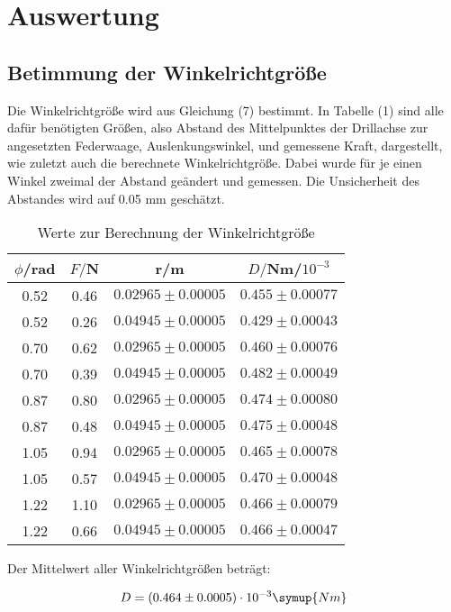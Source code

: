 \section{Auswertung}
\label{sec:Auswertung}

\subsection{Betimmung der Winkelrichtgröße}
Die Winkelrichtgröße wird aus Gleichung (7) bestimmt. In Tabelle (1) sind alle dafür benötigten Größen, also 
Abstand des Mittelpunktes der Drillachse zur angesetzten Federwaage, Auslenkungswinkel, und gemessene Kraft, dargestellt, 
wie zuletzt auch die berechnete Winkelrichtgröße. Dabei wurde für je einen Winkel zweimal der Abstand geändert und
gemessen. Die Unsicherheit des Abstandes wird auf 0.05 mm geschätzt.


\begin{table}[H]
  \centering
  \caption{Werte zur Berechnung der Winkelrichtgröße}
  \label{tab:Parameter}
  \begin{tabular}{c c c c}
    \toprule
    $\phi$/rad & $F/$N & r/m & $D/$Nm/$10^{-3}$\\
    \bottomrule
     0.52 & 0.46  & $0.02965 \pm 0.00005$ & $0.455 \pm 0.00077$ \\
     0.52 & 0.26  & $0.04945 \pm 0.00005$ & $0.429 \pm 0.00043$\\
     0.70 & 0.62  & $0.02965 \pm 0.00005$ & $0.460 \pm 0.00076$\\
     0.70 & 0.39  & $0.04945 \pm 0.00005$ & $0.482 \pm 0.00049$\\
     0.87 & 0.80  & $0.02965 \pm 0.00005$ & $0.474 \pm 0.00080$\\
     0.87 & 0.48  & $0.04945 \pm 0.00005$ & $0.475 \pm 0.00048$\\
     1.05 & 0.94  & $0.02965 \pm 0.00005$ & $0.465 \pm 0.00078$\\
     1.05 & 0.57  & $0.04945 \pm 0.00005$ & $0.470 \pm 0.00048$\\
     1.22 & 1.10  & $0.02965 \pm 0.00005$ & $0.466 \pm 0.00079$\\
     1.22 & 0.66  & $0.04945 \pm 0.00005$ & $0.466 \pm 0.00047$\\
    \bottomrule
  \end{tabular}
\end{table}

Der Mittelwert aller Winkelrichtgrößen beträgt:

\begin{equation}
  D = (0.464 \pm 0.0005)\cdot 10^{-3} \symup{Nm}
\end{equation}






